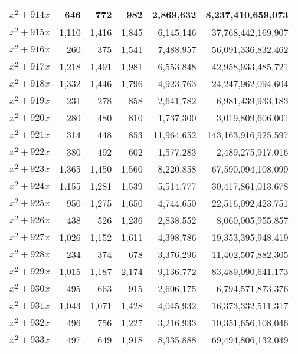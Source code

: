 \documentclass[a4paper]{amsproc}
\theoremstyle{plain}
\theoremstyle{named}
\begin{document}
\begin{longtable}{ | l | r | r | r | r | r | }
$x^2 + 914x$ & 646 & 772 & 982 & 2{,}869{,}632 & 8{,}237{,}410{,}659{,}073 \\ \hline
$x^2 + 915x$ & 1{,}110 & 1{,}416 & 1{,}845 & 6{,}145{,}146 & 37{,}768{,}442{,}169{,}907 \\ \hline
$x^2 + 916x$ & 260 & 375 & 1{,}541 & 7{,}488{,}957 & 56{,}091{,}336{,}832{,}462 \\ \hline
$x^2 + 917x$ & 1{,}218 & 1{,}491 & 1{,}981 & 6{,}553{,}848 & 42{,}958{,}933{,}485{,}721 \\ \hline
$x^2 + 918x$ & 1{,}332 & 1{,}446 & 1{,}796 & 4{,}923{,}763 & 24{,}247{,}962{,}094{,}604 \\ \hline
$x^2 + 919x$ & 231 & 278 & 858 & 2{,}641{,}782 & 6{,}981{,}439{,}933{,}183 \\ \hline
$x^2 + 920x$ & 280 & 480 & 810 & 1{,}737{,}300 & 3{,}019{,}809{,}606{,}001 \\ \hline
$x^2 + 921x$ & 314 & 448 & 853 & 11{,}964{,}652 & 143{,}163{,}916{,}925{,}597 \\ \hline
$x^2 + 922x$ & 380 & 492 & 602 & 1{,}577{,}283 & 2{,}489{,}275{,}917{,}016 \\ \hline
$x^2 + 923x$ & 1{,}365 & 1{,}450 & 1{,}560 & 8{,}220{,}858 & 67{,}590{,}094{,}108{,}099 \\ \hline
$x^2 + 924x$ & 1{,}155 & 1{,}281 & 1{,}539 & 5{,}514{,}777 & 30{,}417{,}861{,}013{,}678 \\ \hline
$x^2 + 925x$ & 950 & 1{,}275 & 1{,}650 & 4{,}744{,}650 & 22{,}516{,}092{,}423{,}751 \\ \hline
$x^2 + 926x$ & 438 & 526 & 1{,}236 & 2{,}838{,}552 & 8{,}060{,}005{,}955{,}857 \\ \hline
$x^2 + 927x$ & 1{,}026 & 1{,}152 & 1{,}611 & 4{,}398{,}786 & 19{,}353{,}395{,}948{,}419 \\ \hline
$x^2 + 928x$ & 234 & 374 & 678 & 3{,}376{,}296 & 11{,}402{,}507{,}882{,}305 \\ \hline
$x^2 + 929x$ & 1{,}015 & 1{,}187 & 2{,}174 & 9{,}136{,}772 & 83{,}489{,}090{,}641{,}173 \\ \hline
$x^2 + 930x$ & 495 & 663 & 915 & 2{,}606{,}175 & 6{,}794{,}571{,}873{,}376 \\ \hline
$x^2 + 931x$ & 1{,}043 & 1{,}071 & 1{,}428 & 4{,}045{,}932 & 16{,}373{,}332{,}511{,}317 \\ \hline
$x^2 + 932x$ & 496 & 756 & 1{,}227 & 3{,}216{,}933 & 10{,}351{,}656{,}108{,}046 \\ \hline
$x^2 + 933x$ & 497 & 649 & 1{,}918 & 8{,}335{,}888 & 69{,}494{,}806{,}132{,}049 \\ \hline

\end{longtable}
\end{document}
